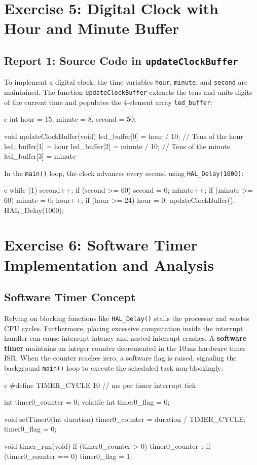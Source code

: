 \documentclass{hcmut-report}
\begin{document}
\newpage
\section{Exercise 5: Digital Clock with Hour and Minute Buffer}

\subsection*{Report 1: Source Code in \texttt{updateClockBuffer}}
To implement a digital clock, the time variables \texttt{hour}, \texttt{minute}, and \texttt{second} are maintained. The function \texttt{updateClockBuffer} extracts the tens and units digits of the current time and populates the 4-element array \texttt{led\_buffer}:
\begin{code}{c}
int hour = 15, minute = 8, second = 50;

void updateClockBuffer(void) {
    led_buffer[0] = hour / 10;    // Tens of the hour
    led_buffer[1] = hour %
    led_buffer[2] = minute / 10;  // Tens of the minute
    led_buffer[3] = minute %
}
\end{code}

In the \texttt{main()} loop, the clock advances every second using \texttt{HAL\_Delay(1000)}:
\begin{code}{c}
while (1)
{
    second++;
    if (second >= 60) {
        second = 0;
        minute++;
    }
    if (minute >= 60) {
        minute = 0;
        hour++;
    }
    if (hour >= 24) {
        hour = 0;
    }
    updateClockBuffer();
    HAL_Delay(1000);
}
\end{code}

\newpage
\section{Exercise 6: Software Timer Implementation and Analysis}

\subsection{Software Timer Concept}
Relying on blocking functions like \texttt{HAL\_Delay()} stalls the processor and wastes CPU cycles. Furthermore, placing excessive computation inside the interrupt handler can cause interrupt latency and nested interrupt crashes.
A \textbf{software timer} maintains an integer counter decremented in the $10\,\text{ms}$ hardware timer ISR. When the counter reaches zero, a software flag is raised, signaling the background \texttt{main()} loop to execute the scheduled task non-blockingly:
\begin{code}{c}
#define TIMER_CYCLE 10  // ms per timer interrupt tick

int timer0_counter = 0;
volatile int timer0_flag = 0;

void setTimer0(int duration) {
    timer0_counter = duration / TIMER_CYCLE;
    timer0_flag = 0;
}

void timer_run(void) {
    if (timer0_counter > 0) {
        timer0_counter--;
        if (timer0_counter == 0) timer0_flag = 1;
    }
}
\end{code}
\end{document}
